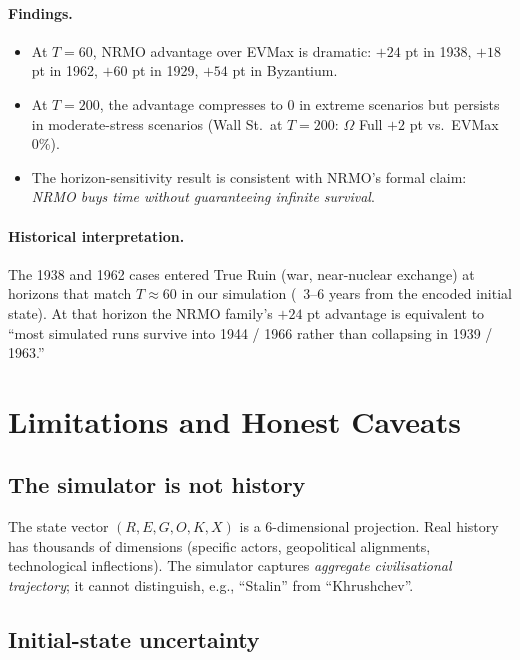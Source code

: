 \paragraph{Findings.}

\begin{itemize}
\item At $T = 60$, NRMO advantage over EVMax is dramatic: $+24$ pt
in 1938, $+18$ pt in 1962, $+60$ pt in 1929, $+54$ pt in
Byzantium.
\item At $T = 200$, the advantage compresses to $0$ in extreme
scenarios but persists in moderate-stress scenarios (Wall St.\ at
$T = 200$: $\Omega$ Full $+2$ pt vs.~EVMax 0\%).
\item The horizon-sensitivity result is consistent with NRMO's
formal claim: \emph{NRMO buys time without guaranteeing infinite
survival}.
\end{itemize}

\paragraph{Historical interpretation.}
The 1938 and 1962 cases entered True Ruin (war, near-nuclear
exchange) at horizons that match $T \approx 60$ in our simulation
(~3--6 years from the encoded initial state). At that horizon the
NRMO family's $+24$ pt advantage is equivalent to ``most simulated
runs survive into 1944 / 1966 rather than collapsing in 1939 /
1963.''

\section{Limitations and Honest Caveats}
\label{sec:hist-limitations}

\subsection{The simulator is not history}

The state vector $(R, E, G, O, K, X)$ is a 6-dimensional projection.
Real history has thousands of dimensions (specific actors,
geopolitical alignments, technological inflections). The simulator
captures \emph{aggregate civilisational trajectory}; it cannot
distinguish, e.g., ``Stalin'' from ``Khrushchev''.

\subsection{Initial-state uncertainty}

